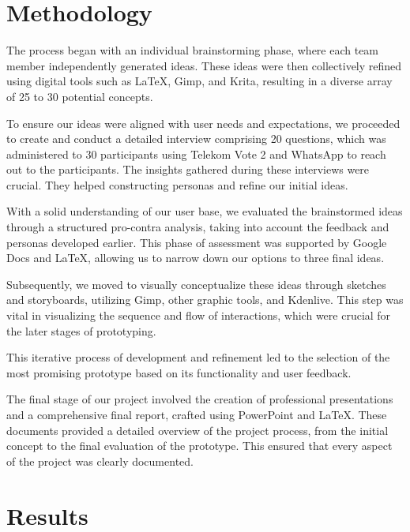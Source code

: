 \documentclass{article}
\begin{document}
\section{Methodology}
The process began with an individual brainstorming phase,
where each team member independently generated ideas.
These ideas were then collectively refined using digital tools such as LaTeX, Gimp, and Krita,
resulting in a diverse array of 25 to 30 potential concepts.

To ensure our ideas were aligned with user needs and expectations,
we proceeded to create and conduct a detailed interview comprising 20 questions,
which was administered to 30 participants using Telekom Vote 2 and WhatsApp to reach out to the participants.
The insights gathered during these interviews were crucial. They helped constructing personas and refine our initial ideas.

With a solid understanding of our user base,
we evaluated the brainstormed ideas through a structured pro-contra analysis,
taking into account the feedback and personas developed earlier.
This phase of assessment was supported by Google Docs and LaTeX,
allowing us to narrow down our options to three final ideas.

Subsequently, we moved to visually conceptualize these ideas through sketches and storyboards,
utilizing Gimp, other graphic tools, and Kdenlive.
This step was vital in visualizing the sequence and flow of interactions,
which were crucial for the later stages of prototyping.

This iterative process of development and refinement led to the selection
of the most promising prototype based on its functionality and user feedback.

The final stage of our project involved the creation of professional presentations and a comprehensive final report,
crafted using PowerPoint and LaTeX. These documents provided a detailed overview of the project process,
from the initial concept to the final evaluation of the prototype.
This ensured that every aspect of the project was clearly documented.

\section{Results}
\end{document}
